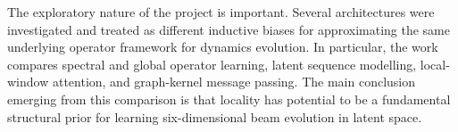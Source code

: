The exploratory nature of the project is important. Several architectures were investigated and treated as different inductive biases for approximating the same underlying operator framework for dynamics evolution. In particular, the work compares spectral and global operator learning, latent sequence modelling, local-window attention, and graph-kernel message passing. The main conclusion emerging from this comparison is that locality has potential to be a fundamental structural prior for learning six-dimensional beam evolution in latent space.



